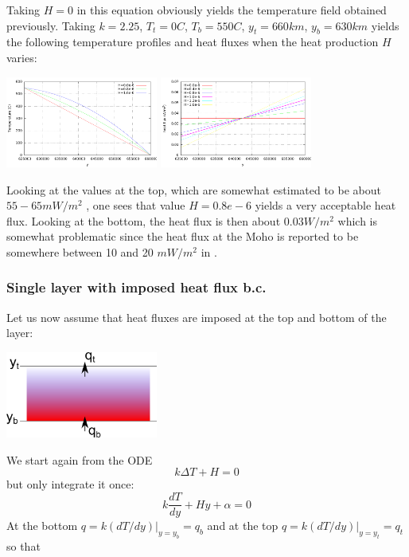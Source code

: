 Taking $H=0$ in this equation obviously yields the temperature field obtained previously.
Taking $k=2.25$, $T_t=0C$, $T_b=550C$, $y_t=660km$, $y_b=630km$ yields the following
temperature profiles and heat fluxes when the heat production $H$ varies:
\begin{center}
\includegraphics[width=5cm]{images/initial_temperature/temperature1.pdf}
\includegraphics[width=5cm]{images/initial_temperature/heatflux1.pdf}
\end{center}
Looking at the values at the top, which are somewhat estimated to be
about $55-65mW/m^2$ \cite[table 8.6]{jama}, one sees that value $H=0.8e-6$ yields a very acceptable
heat flux.
Looking at the bottom, the heat flux is then about $0.03W/m^2$
which is somewhat problematic since the heat flux at the Moho
is reported to be somewhere between 10 and 20 $mW/m^2$ in \cite[table 7.1]{jama}.


\subsubsection{Single layer with imposed heat flux b.c.}

Let us now assume that heat fluxes are imposed at the top and bottom of the layer:
\begin{center} 
\includegraphics[width=5cm]{images/initial_temperature/tempcond2.png}
\end{center}

We start again from the ODE
\[
k \Delta T + H = 0 
\]
but only integrate it once:
\[
k \frac{dT}{dy}  + H y + \alpha  = 0 
\]
At the bottom $q=k(dT/dy)|_{y=y_b} = q_b$ and at the top
$q=k(dT/dy)|_{y=y_t} = q_t$ so that 

